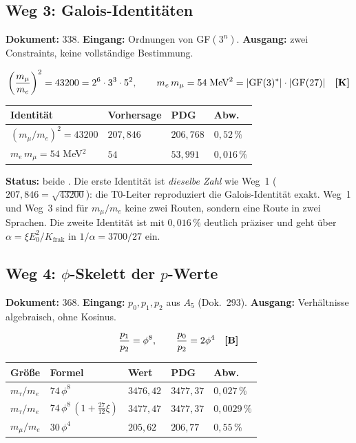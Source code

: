 \subsection{Weg 3: Galois-Identitäten}

\textbf{Dokument:} 338. \quad
\textbf{Eingang:} Ordnungen von GF$(3^n)$. \quad
\textbf{Ausgang:} zwei Constraints, keine vollständige Bestimmung.

\[
  \left(\frac{m_\mu}{m_e}\right)^2 = 43200 = 2^6\cdot3^3\cdot5^2, \qquad
  m_e\,m_\mu = 54\;\text{MeV}^2 = |\text{GF}(3)^*|\cdot|\text{GF}(27)| \quad \textbf{[K]}
\]

\begin{center}
\begin{tabular}{@{}llll@{}}
\toprule
Identität & Vorhersage & PDG & Abw. \\
\midrule
$(m_\mu/m_e)^2 = 43200$ & $207{,}846$ & $206{,}768$ & $0{,}52\,\%$ \\
$m_e\,m_\mu = 54$ MeV$^2$ & $54$ & $53{,}991$ & $0{,}016\,\%$ \\
\bottomrule
\end{tabular}
\end{center}

\textbf{Status:} beide \KM. Die erste Identität ist \emph{dieselbe Zahl} wie Weg~1
($207{,}846 = \sqrt{43200}$): die T0-Leiter reproduziert die Galois-Identität exakt.
Weg~1 und Weg~3 sind für $m_\mu/m_e$ keine zwei Routen, sondern eine Route in zwei
Sprachen. Die zweite Identität ist mit $0{,}016\,\%$ deutlich präziser und geht über
$\alpha = \xi E_0^2/K_\text{frak}$ in $1/\alpha = 3700/27$ ein.

\subsection{Weg 4: $\phi$-Skelett der $p$-Werte}

\textbf{Dokument:} 368. \quad
\textbf{Eingang:} $p_0,p_1,p_2$ aus $A_5$ (Dok.~293). \quad
\textbf{Ausgang:} Verhältnisse algebraisch, ohne Kosinus.

\[
  \frac{p_1}{p_2} = \phi^8, \qquad \frac{p_0}{p_2} = 2\phi^4 \quad \textbf{[B]}
\]

\begin{center}
\begin{tabular}{@{}lllll@{}}
\toprule
Größe & Formel & Wert & PDG & Abw. \\
\midrule
$m_\tau/m_e$ & $74\,\phi^8$ & $3476{,}42$ & $3477{,}37$ & $0{,}027\,\%$ \\
$m_\tau/m_e$ & $74\,\phi^8\,(1+\tfrac{27}{12}\xi)$ & $3477{,}47$ & $3477{,}37$ & $0{,}0029\,\%$ \\
$m_\mu/m_e$  & $30\,\phi^4$ & $205{,}62$ & $206{,}77$ & $0{,}55\,\%$ \\
\bottomrule
\end{tabular}
\end{center}

